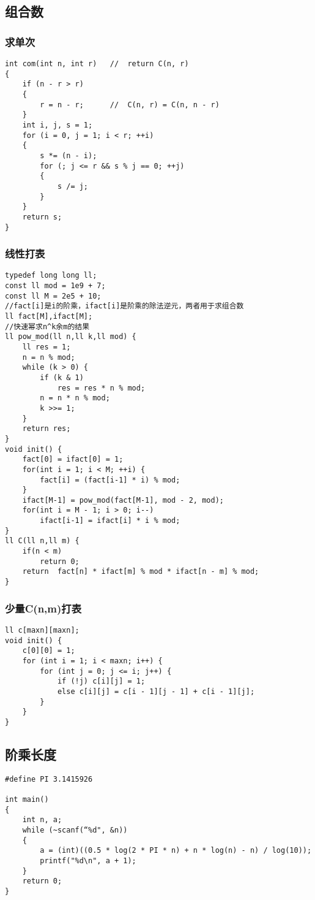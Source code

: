 \subsection{组合数}
\subsubsection{求单次}
\begin{lstlisting}
int com(int n, int r)   //  return C(n, r)
{
	if (n - r > r)
	{
		r = n - r;      //  C(n, r) = C(n, n - r)
	}
	int i, j, s = 1;
	for (i = 0, j = 1; i < r; ++i)
	{
		s *= (n - i);
		for (; j <= r && s % j == 0; ++j)
		{
			s /= j;
		}
	}
	return s;
}
\end{lstlisting}

\subsubsection{线性打表}
\begin{lstlisting}
typedef long long ll;
const ll mod = 1e9 + 7;
const ll M = 2e5 + 10;
//fact[i]是i的阶乘，ifact[i]是阶乘的除法逆元，两者用于求组合数
ll fact[M],ifact[M];
//快速幂求n^k余m的结果
ll pow_mod(ll n,ll k,ll mod) {
	ll res = 1;
	n = n % mod;
	while (k > 0) {
		if (k & 1)
			res = res * n % mod;
		n = n * n % mod;
		k >>= 1;
	}
	return res;
}
void init() {
	fact[0] = ifact[0] = 1;
	for(int i = 1; i < M; ++i) {
		fact[i] = (fact[i-1] * i) % mod;
	}
	ifact[M-1] = pow_mod(fact[M-1], mod - 2, mod);
	for(int i = M - 1; i > 0; i--)
		ifact[i-1] = ifact[i] * i % mod;
}
ll C(ll n,ll m) {
	if(n < m)
		return 0;
	return  fact[n] * ifact[m] % mod * ifact[n - m] % mod;
}
\end{lstlisting}

\subsubsection{少量C(n,m)打表}
\begin{lstlisting}
ll c[maxn][maxn];
void init() {
	c[0][0] = 1;
	for (int i = 1; i < maxn; i++) {
		for (int j = 0; j <= i; j++) {
			if (!j) c[i][j] = 1;
			else c[i][j] = c[i - 1][j - 1] + c[i - 1][j];
		}
	}
}
\end{lstlisting}

\subsection{阶乘长度}
\begin{lstlisting}
#define PI 3.1415926

int main()
{
	int n, a;
	while (~scanf(“%d", &n))
	{
		a = (int)((0.5 * log(2 * PI * n) + n * log(n) - n) / log(10));
		printf("%d\n", a + 1);
	}
	return 0;
}
\end{lstlisting}

